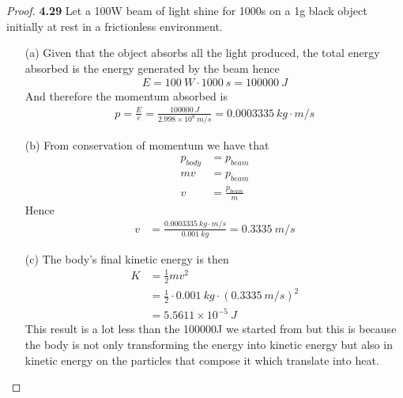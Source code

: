 \documentclass[11pt]{article}
\theoremstyle{definition}
\begin{document}
\cleardoublepage
\begin{proof}{\textbf{4.29}}
    Let a 100W beam of light shine for 1000s on a 1g black object initially 
    at rest in a frictionless environment.
    \begin{itemize}
        \item [(a)] Given that the object absorbs all the light produced,
        the total energy absorbed is the energy generated by the beam hence
        \begin{align*}
            E = 100~W \cdot 1000~s = 100000~J %
        \end{align*}
        And therefore the momentum absorbed is 
        \begin{align*}
            p = \frac{E}{c} = \frac{100000~J}{2.998\times 10^8~m/s}
            = 0.0003335~kg\cdot m/s %
        \end{align*}
        \item[(b)] From conservation of momentum we have that
        \begin{align*}
            p_{body} &= p_{beam}\\
            mv &= p_{beam}\\
            v &= \frac{p_{beam}}{m}
        \end{align*}
        Hence
        \begin{align*}
            v &= \frac{0.0003335~kg\cdot m/s}{0.001~kg} = 0.3335~m/s
        \end{align*}
        \item[(c)] The body's final kinetic energy is then
        \begin{align*}
            K &= \frac{1}{2}mv^2\\
            &= \frac{1}{2} \cdot 0.001~kg \cdot (0.3335~m/s)^2\\
            &= 5.5611\times 10^{-5}~J 
        \end{align*}
        This result is a lot less than the 100000J we started from but this is
        because the body is not only transforming the energy into kinetic
        energy but also in kinetic energy on the particles that compose it
        which translate into heat.
        
    \end{itemize}
\end{proof}
\end{document}
